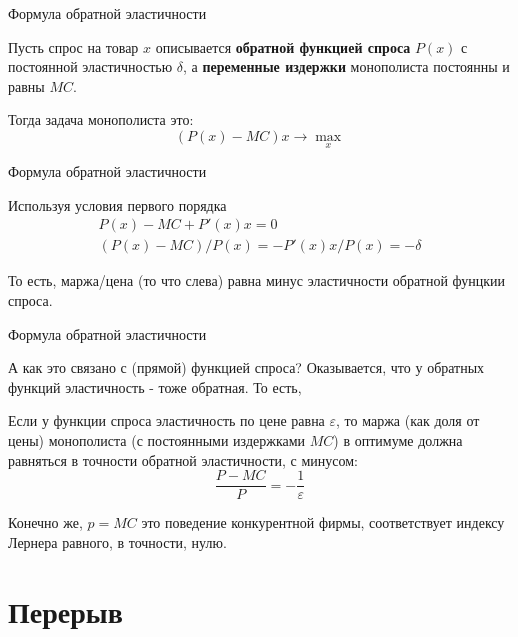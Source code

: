 \documentclass{beamer}
\begin{document}
\begin{frame}{Формула обратной эластичности}

Пусть спрос на товар $x$ описывается \textbf{обратной функцией спроса} $P(x)$ с постоянной эластичностью $\delta$, а \textbf{переменные издержки} монополиста постоянны и равны $MC$. 

Тогда задача монополиста это:
$$ (P(x) - MC)x \to \max_x$$

\end{frame}

\begin{frame}{Формула обратной эластичности}

Используя условия первого порядка
\begin{gather*}
P(x) - MC + P'(x)x = 0\\
(P(x) - MC)/P(x) = - P'(x)x/P(x) = - \delta
\end{gather*}


То есть, маржа/цена (то что слева) равна минус эластичности обратной фунцкии спроса.
\end{frame}

\begin{frame}{Формула обратной эластичности}

А как это связано с (прямой) функцией спроса? Оказывается, что у обратных функций эластичность - тоже обратная. То есть, 

\begin{lemma}
Если у функции спроса эластичность по цене равна $\varepsilon$, то маржа (как доля от цены) монополиста (с постоянными издержками $MC$) в оптимуме должна равняться в точности обратной эластичности, с минусом:
$$\frac{P-MC}{P} = - \frac{1}{\varepsilon}$$
\end{lemma}
Конечно же, $p=MC$ это поведение конкурентной фирмы, соответствует индексу Лернера равного, в точности, нулю.
\end{frame}

\section{Перерыв}
\end{document}
